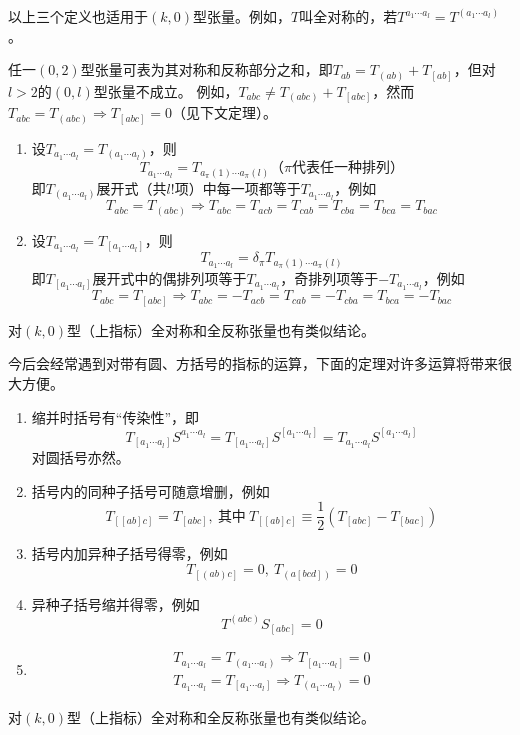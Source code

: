 以上三个定义也适用于$(k, 0)$型张量。例如，$T$叫全对称的，若$T^{a_1 \cdots a_l} = T^{(a_1 \cdots a_l)}$。

\begin{note}
任一$(0, 2)$型张量可表为其对称和反称部分之和，即$T_{ab} = T_{(ab)} + T_{[ab]}$，但对$l > 2$的$(0, l)$型张量不成立。
例如，$T_{abc} \neq T_{(abc)} + T_{[abc]}$，然而$T_{abc} = T_{(abc)} \Rightarrow T_{[abc]} = 0$（见下文定理）。
\end{note}

\begin{theorem}
\begin{enumerate}[（a）]
\item 设$T_{a_1 \cdots a_l} = T_{(a_1 \cdots a_l)}$，则
$$T_{a_1 \cdots a_l} = T_{a_\pi(1) \cdots a_\pi(l)}\text{（$\pi$代表任一种排列）}$$
即$T_{(a_1 \cdots a_l)}$展开式（共$l!$项）中每一项都等于$T_{a_1 \cdots a_l}$，例如
$$T_{abc} = T_{(abc)} \Rightarrow T_{abc} = T_{acb} = T_{cab} = T_{cba} = T_{bca} = T_{bac}$$
\item 设$T_{a_1 \cdots a_l} = T_{[a_1 \cdots a_l]}$，则
$$T_{a_1 \cdots a_l} = \delta_\pi T_{a_\pi(1) \cdots a_\pi(l)}$$
即$T_{[a_1 \cdots a_l]}$展开式中的偶排列项等于$T_{a_1 \cdots a_l}$，奇排列项等于$-T_{a_1 \cdots a_l}$，例如
$$T_{abc} = T_{[abc]} \Rightarrow T_{abc} = -T_{acb} = T_{cab} = -T_{cba} = T_{bca} = -T_{bac}$$
\end{enumerate}
对$(k, 0)$型（上指标）全对称和全反称张量也有类似结论。
\end{theorem}

今后会经常遇到对带有圆、方括号的指标的运算，下面的定理对许多运算将带来很大方便。

\begin{theorem}
\begin{enumerate}[（a）]
\item 缩并时括号有``传染性''，即
$$T_{[a_1 \cdots a_l]}S^{a_1 \cdots a_l} = T_{[a_1 \cdots a_l]}S^{[a_1 \cdots a_l]} = T_{a_1 \cdots a_l}S^{[a_1 \cdots a_l]}$$
对圆括号亦然。
\item 括号内的同种子括号可随意增删，例如
$$T_{[[ab]c]} = T_{[abc]}, ~ \text{其中} ~ T_{[[ab]c]} \equiv \frac{1}{2}(T_{[abc]} - T_{[bac]})$$
\item 括号内加异种子括号得零，例如
$$T_{[(ab)c]} = 0, ~ T_{(a[bcd])} = 0$$
\item 异种子括号缩并得零，例如
$$T^{(abc)}S_{[abc]} = 0$$
\item \begin{gather*}
T_{a_1 \cdots a_l} = T_{(a_1 \cdots a_l)} \Rightarrow T_{[a_1 \cdots a_l]} = 0 \\
T_{a_1 \cdots a_l} = T_{[a_1 \cdots a_l]} \Rightarrow T_{(a_1 \cdots a_l)} = 0
\end{gather*}
\end{enumerate}
对$(k, 0)$型（上指标）全对称和全反称张量也有类似结论。
\end{theorem}
